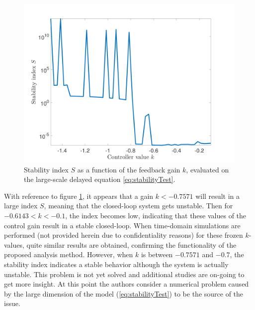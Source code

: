 \documentclass[graybox]{svmult}
\begin{document}
\begin{figure}[bth]
	\sidecaption[]
	\includegraphics[scale=.2]{stabilityAnalysis.pdf}
	\caption{Stability index $S$ as a function of the feedback gain $k$, evaluated on the large-scale delayed equation \eqref{eq:stabilityTest}. }
	\label{fig:stability}	
\end{figure}
With reference to figure \ref{fig:stability}, it appears that a gain $k<-0.7571$ will result in a large index $S$, meaning that the closed-loop system gets unstable. Then for $-0.6143<k<-0.1$, the index becomes low, indicating that these values of the control gain result in a stable closed-loop. When time-domain simulations are performed (not provided herein due to confidentiality reasons) for these frozen $k$-values, quite similar results are obtained, confirming the functionality of the proposed analysis method.
However, when $k$ is  between $-0.7571$ and $-0.7$, the stability index indicates a stable behavior although the system is actually unstable. This problem is not yet solved and additional studies are on-going to get more insight.
At this point the authors consider a numerical problem caused by the large dimension of the model (\ref{eq:stabilityTest})  to be the source of the issue. 

\vspace{-2mm}
\end{document}
